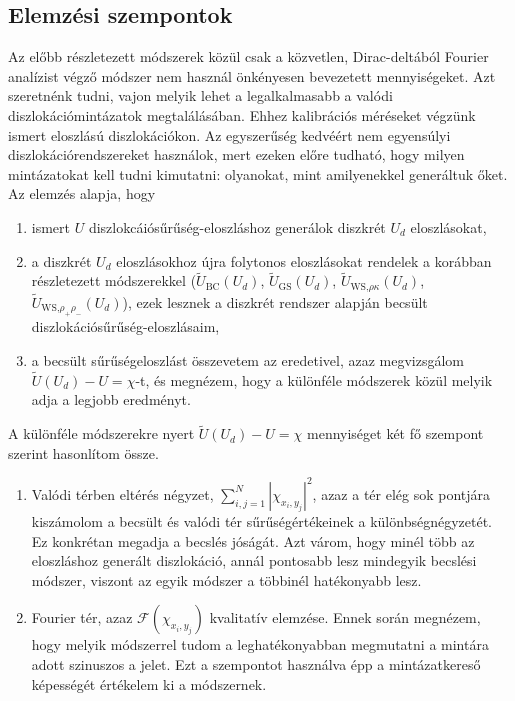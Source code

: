 \documentclass[10pt,a4paper]{scrartcl}
\begin{document}
\subsection{Elemzési szempontok}
Az előbb részletezett módszerek közül csak a közvetlen, Dirac-deltából Fourier analízist végző módszer nem használ önkényesen bevezetett mennyiségeket. Azt szeretnénk tudni, vajon melyik lehet a legalkalmasabb a valódi diszlokációmintázatok megtalálásában. Ehhez kalibrációs méréseket végzünk ismert eloszlású diszlokációkon. Az egyszerűség kedvéért nem egyensúlyi diszlokációrendszereket használok, mert ezeken előre tudható, hogy milyen mintázatokat kell tudni kimutatni: olyanokat, mint amilyenekkel generáltuk őket. Az elemzés alapja, hogy
\begin{enumerate}
    \item ismert $U$ diszlokcáiósűrűség-eloszláshoz generálok diszkrét $U_d$ eloszlásokat,
    \item a diszkrét $U_d$ eloszlásokhoz újra folytonos eloszlásokat rendelek a korábban részletezett módszerekkel (${\tilde U_{{\text{BC}}}}\left( {{U_d}} \right)$, ${\tilde U_{{\text{GS}}}}\left( {{U_d}} \right)$, ${\tilde U_{{\text{WS,}}\rho \kappa }}\left( {{U_d}} \right)$, ${\tilde U_{{\text{WS,}}{\rho _ + }{\rho _ - }}}\left( {{U_d}} \right)$), ezek lesznek a diszkrét rendszer alapján becsült diszlokációsűrűség-eloszlásaim,
    \item a becsült sűrűségeloszlást összevetem az eredetivel, azaz megvizsgálom $\tilde U\left( {{U_d}} \right) - U = \chi $-t, és megnézem, hogy a különféle módszerek közül melyik adja a legjobb eredményt.
\end{enumerate}

A különféle módszerekre nyert $\tilde U\left( {{U_d}} \right) - U = \chi $ mennyiséget két fő szempont szerint hasonlítom össze.
\begin{enumerate}
    \item Valódi térben eltérés négyzet, $\sum\limits_{i,j = 1}^N {{{\left| {{\chi _{{x_i},{y_j}}}} \right|}^2}} $, azaz a tér elég sok pontjára kiszámolom a becsült és valódi tér sűrűségértékeinek a különbségnégyzetét. Ez konkrétan megadja a becslés jóságát. Azt várom, hogy minél több az eloszláshoz generált diszlokáció, annál pontosabb lesz mindegyik becslési módszer, viszont az egyik módszer a többinél hatékonyabb lesz.
    \item Fourier tér, azaz $\mathcal{F}\left( {{\chi _{{x_i},{y_j}}}} \right)$ kvalitatív elemzése. Ennek során megnézem, hogy melyik módszerrel tudom a leghatékonyabban megmutatni a mintára adott szinuszos a jelet. Ezt a szempontot használva épp a mintázatkereső képességét értékelem ki a módszernek.
\end{enumerate}
\end{document}
